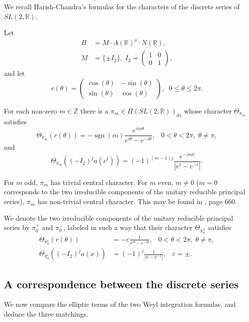 \documentclass[12pt,letterpaper,openany]{book}
\theoremstyle{plain}
\theoremstyle{definition}
\theoremstyle{remark}
\theoremstyle{remark}
\DeclareMathOperator{\sgn}{sgn}
\begin{document}
We recall Harish-Chandra's formulas for the characters of the discrete series of $SL(2,{\mathbb R})$.


Let
\begin{align*}
B &=M\cdot A(\mathbb{R})^o\cdot N(\mathbb{R}), \\
M &=\{\pm I_2\},\;I_2=\left(
\begin{array}{cc}
1 & 0 \\
0 & 1
\end{array}
\right) ,
\end{align*}
and let
\[
r(\theta )=\left(
\begin{array}{cc}
\cos (\theta ) & -\sin (\theta ) \\
\sin (\theta ) & \cos (\theta )
\end{array}
\right) ,\;\;0\leq \theta \leq 2\pi .
\]

For each non-zero $m\in \mathbb{Z}$ there is a $\pi _m\in \Pi (SL(2,\mathbb{R}%
))_{ds}$ whose character $\Theta _{\pi _m}$ satisfies
\[
\Theta _{\pi _m}(r(\theta ))=-\sgn(m)
\frac{e^{im\theta }}{e^{i\theta }-e^{-i\theta }},
\;\;\;0<\theta <2\pi ,\;\theta \neq \pi ,
\]
and
\[
\Theta _{\pi _m}((-I_2)^j a(e^t ))=(-1)^{(m-1)j}
\frac{e^{-|mt| }}{|e^t-e^{-t}|}.
\]

For $m$ odd, $\pi _m$ has trivial central character. For $m$ even, $m\neq 0$
($m=0$ corresponds to the two irreducible components of the unitary
reducible principal series), $\pi _m$ has non-trivial central character.
This may be found in \cite{HC2}, page 660.

We denote the two irreducible components of the unitary reducible principal
series by $\pi _0^{+}$ and $\pi _0^{-}$, labeled in such a way that their
character $\Theta _{\pi _0^{\pm }}$ satisfies
\begin{align*}
\Theta _{\pi _0^\varepsilon }(r(\theta )) &=-\varepsilon \frac 1{e^{i\theta
}-e^{-i\theta }},\;\;\;0<\theta <2\pi ,\;\theta \neq \pi , \\
\Theta _{\pi _0^\varepsilon }((-I_2)^ja(x)) &=(-1)^j\frac
1{|x-x^{-1}|},\;\;\;\varepsilon =\pm .
\end{align*}

\subsection{A correspondence between the discrete series}

We now compare the elliptic terms of the two Weyl integration formulas, and deduce the three matchings.
\end{document}
